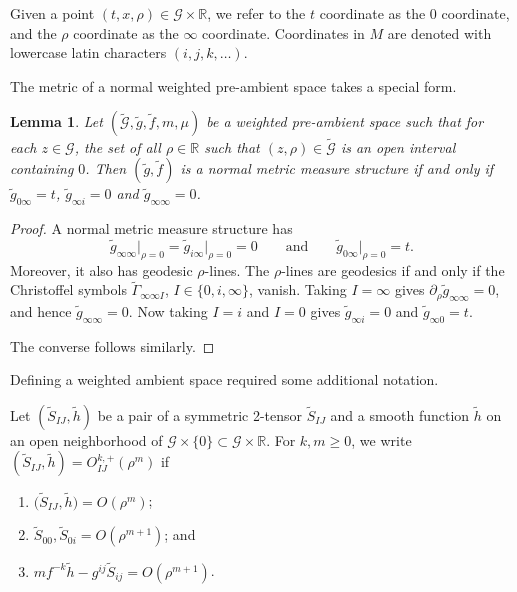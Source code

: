 \documentclass[pdftex]{sigma}
\newcommand{\cg}{\widetilde{g}}
\newcommand{\cf}{\widetilde{f}}
\newcommand{\cmG}{\widetilde{\mathcal{G}}}
\newcommand{\mG}{\mathcal{G}}
\newcommand{\bR}{\mathbb{R}}
\numberwithin{equation}{section}
\newtheorem{Lemma}[Theorem]{Lemma}
\begin{document}
Given a point $(t,x,\rho)\in \mathcal{G}\times \bR$, we refer to the $t$ coordinate as the $0$ coordinate, and the $\rho$ coordinate as the $\infty$ coordinate. Coordinates in $M$ are denoted with lowercase latin characters $(i,j,k,\dots)$.

The metric of a normal weighted pre-ambient space takes a special form.

\begin{Lemma}
\label{straight-metric-lemma}
Let $(\cmG,\cg,\cf,m,\mu)$ be a weighted pre-ambient space such that for each $z\in\mG$, the set of all $\rho\in\bR$ such that $(z,\rho)\in\cmG$ is an open interval containing $0$. Then $(\cg,\cf)$ is a \textit{normal} metric measure structure if and only if $\cg_{0\infty}=t$, $\cg_{\infty i}=0$ and $\cg_{\infty\infty}=0$.
\end{Lemma}

\begin{proof}
A normal metric measure structure has
\[
\widetilde{g}_{\infty\infty}\big|_{\rho=0}=\widetilde{g}_{i\infty}\big|_{\rho=0}=0 \qquad\text{and}\qquad \widetilde{g}_{0\infty}\big|_{\rho=0}=t.
\]
Moreover, it also has geodesic $\rho$-lines. The $\rho$-lines are geodesics if and only if the Christoffel symbols $\widetilde{\Gamma}_{\infty \infty I}$, $I\in \{0,i,\infty\}$, vanish. Taking $I=\infty$ gives $\partial_{\rho} \widetilde{g}_{\infty \infty}=0$, and hence $\widetilde{g}_{\infty \infty}=0 .$ Now taking $I=i$ and $I=0$ gives $\widetilde{g}_{\infty i}=0$ and $\widetilde{g}_{\infty 0}=t$.

The converse follows similarly.
\end{proof}
Defining a weighted ambient space required some additional notation.

\begin{Definition}
Let $(\widetilde{S}_{IJ},\widetilde{h})$ be a pair of a symmetric 2-tensor $\widetilde{S}_{IJ}$ and a smooth function $\widetilde{h}$ on an open neighborhood of $\mathcal{G}\times \{0\}\subset\mathcal{G}\times \bR$. For $k,m\geq 0$, we write $(\widetilde{S}_{IJ},\widetilde{h})=O_{IJ}^{k,+}(\rho^m)$ if
\begin{enumerate}[label=$(\roman*)$]\itemsep=0pt
\item $\big(\widetilde{S}_{IJ},\widetilde{h}\big)=O(\rho^{m})$;
\item $\widetilde{S}_{00},\widetilde{S}_{0i}=O(\rho^{m+1})$; and
\item $m f^{-k}\widetilde{h}-g^{ij}\widetilde{S}_{ij}= O(\rho^{m+1})$.
\end{enumerate}
\end{Definition}
\end{document}
